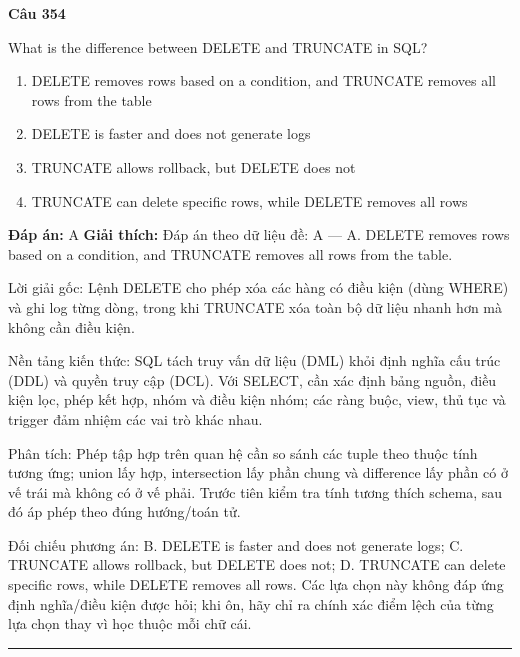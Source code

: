 \documentclass[11pt,a4paper]{article}
\newenvironment{question}[1]{%
  \par\vspace{1em}\noindent\textbf{\large Câu #1}\par\vspace{0.4em}
}{%
  \par\vspace{1em}\hrule\vspace{0.6em}
}
\newenvironment{choices}{%
  \begin{enumerate}[label=\textbf{\Alph*.},leftmargin=2.2em,itemsep=2pt,topsep=3pt]
}{%
  \end{enumerate}
}
\newcommand{\choice}{\item}
\begin{document}
\begin{question}{354}
What is the difference between DELETE and TRUNCATE in SQL?
\begin{choices}
\choice DELETE removes rows based on a condition, and TRUNCATE removes all rows from the table
\choice DELETE is faster and does not generate logs
\choice TRUNCATE allows rollback, but DELETE does not
\choice TRUNCATE can delete specific rows, while DELETE removes all rows
\end{choices}
\textbf{Đáp án:} A
\textbf{Giải thích:} Đáp án theo dữ liệu đề: A — A. DELETE removes rows based on a condition, and TRUNCATE removes all rows from the table.

Lời giải gốc: Lệnh DELETE cho phép xóa các hàng có điều kiện (dùng WHERE) và ghi log từng dòng, trong khi TRUNCATE xóa toàn bộ dữ liệu nhanh hơn mà không cần điều kiện.

Nền tảng kiến thức: SQL tách truy vấn dữ liệu (DML) khỏi định nghĩa cấu trúc (DDL) và quyền truy cập (DCL). Với SELECT, cần xác định bảng nguồn, điều kiện lọc, phép kết hợp, nhóm và điều kiện nhóm; các ràng buộc, view, thủ tục và trigger đảm nhiệm các vai trò khác nhau.

Phân tích: Phép tập hợp trên quan hệ cần so sánh các tuple theo thuộc tính tương ứng; union lấy hợp, intersection lấy phần chung và difference lấy phần có ở vế trái mà không có ở vế phải. Trước tiên kiểm tra tính tương thích schema, sau đó áp phép theo đúng hướng/toán tử.

Đối chiếu phương án: B. DELETE is faster and does not generate logs; C. TRUNCATE allows rollback, but DELETE does not; D. TRUNCATE can delete specific rows, while DELETE removes all rows. Các lựa chọn này không đáp ứng định nghĩa/điều kiện được hỏi; khi ôn, hãy chỉ ra chính xác điểm lệch của từng lựa chọn thay vì học thuộc mỗi chữ cái.
\end{question}
\end{document}
